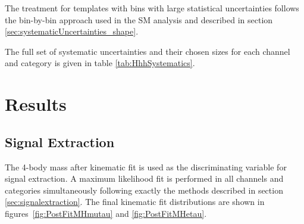 The treatment for templates with bins with large statistical uncertainties
follows the bin-by-bin approach used in the \ac{SM} analysis and described in
section \ref{sec:systematicUncertainties_shape}. 

The full set of systematic
uncertainties and their chosen sizes for each channel and category is given in
table \ref{tab:HhhSystematics}.



\section{Results}
\label{sec:Hhhresults}

\subsection{Signal Extraction}

The 4-body mass after kinematic fit is used as the discriminating variable for
signal extraction. A maximum likelihood fit is performed in all channels and
categories simultaneously following exactly the methods described in section
\ref{sec:signalextraction}. The final kinematic fit distributions are shown in
figures~\ref{fig:PostFitMHmutau} and \ref{fig:PostFitMHetau}.

